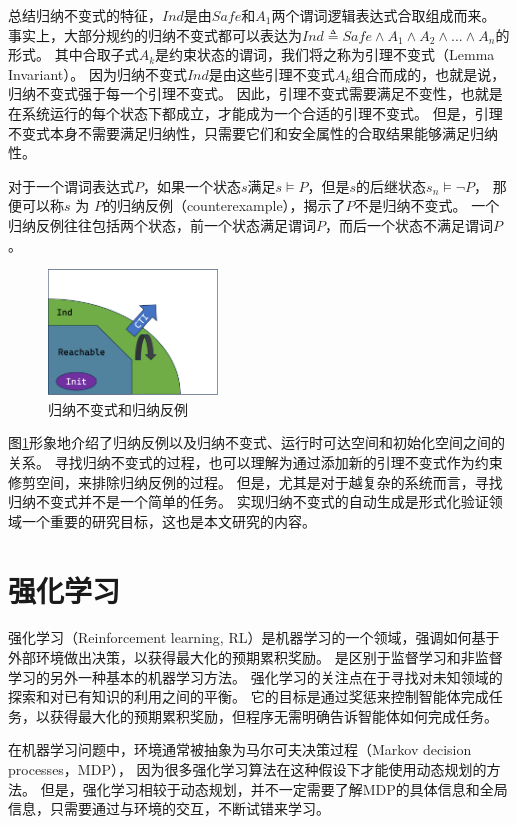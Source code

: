总结归纳不变式的特征，$Ind$是由$Safe$和$A_{1}$两个谓词逻辑表达式合取组成而来。
事实上，大部分规约的归纳不变式都可以表达为$Ind \triangleq Safe \wedge A_1 \wedge A_2 \wedge... \wedge A_n$的形式。
其中合取子式$A_k$是约束状态的谓词，我们将之称为引理不变式（Lemma Invariant）。
因为归纳不变式$Ind$是由这些引理不变式$A_k$组合而成的，也就是说，归纳不变式强于每一个引理不变式。
因此，引理不变式需要满足不变性，也就是在系统运行的每个状态下都成立，才能成为一个合适的引理不变式。
但是，引理不变式本身不需要满足归纳性，只需要它们和安全属性的合取结果能够满足归纳性。

对于一个谓词表达式$P$，如果一个状态$s$满足$s \models P$，但是$s$的后继状态$s_{n} \models \neg P$，
那便可以称$s$ 为 $P$的归纳反例（counterexample），揭示了$P$不是归纳不变式。
一个归纳反例往往包括两个状态，前一个状态满足谓词$P$，而后一个状态不满足谓词$P$。

\begin{figure}
    \centering
    \includegraphics[width=0.4\textwidth]{figures/ind_cti.pdf}
    \caption{归纳不变式和归纳反例}
    \label{fig:ind-cti}
\end{figure}
图\ref{fig:ind-cti}形象地介绍了归纳反例以及归纳不变式、运行时可达空间和初始化空间之间的关系。
寻找归纳不变式的过程，也可以理解为通过添加新的引理不变式作为约束修剪空间，来排除归纳反例的过程。
但是，尤其是对于越复杂的系统而言，寻找归纳不变式并不是一个简单的任务。
实现归纳不变式的自动生成是形式化验证领域一个重要的研究目标，这也是本文研究的内容。


\section{强化学习}
强化学习（Reinforcement learning, RL）\cite{rl}是机器学习的一个领域，强调如何基于外部环境做出决策，以获得最大化的预期累积奖励。
是区别于监督学习和非监督学习的另外一种基本的机器学习方法。
强化学习的关注点在于寻找对未知领域的探索和对已有知识的利用之间的平衡。
它的目标是通过奖惩来控制智能体完成任务，以获得最大化的预期累积奖励，但程序无需明确告诉智能体如何完成任务。

在机器学习问题中，环境通常被抽象为马尔可夫决策过程（Markov decision processes，MDP）\cite{markov}，
因为很多强化学习算法在这种假设下才能使用动态规划的方法。
但是，强化学习相较于动态规划，并不一定需要了解MDP的具体信息和全局信息，只需要通过与环境的交互，不断试错来学习。

